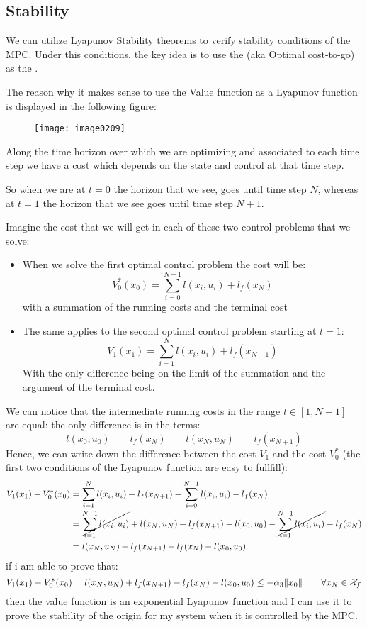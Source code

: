 \subsection{Stability}
We can utilize Lyapunov Stability theorems to verify stability conditions of the MPC. Under this conditions, the key idea is to use the  (aka Optimal cost-to-go) as the .

The reason why it makes sense to use the Value function as a Lyapunov function is displayed in the following figure:
\begin{figure}[!h]
\centering
\texttt{[image: image0209]}
\end{figure}
Along the time horizon over which we are optimizing and associated to each time step we have a cost which depends on the state and control at that time step.

So when we are at $t=0$ the horizon that we see, goes until time step $N$, whereas at $t=1$ the horizon that we see goes until time step $N+1$.

Imagine the cost that we will get in each of these two control problems that we solve:
\begin{itemize}
\item When we solve the first optimal control problem the cost will be:
\[V_0^*(x_0) = \sum_{i=0}^{N-1} l(x_i,u_i) + l_f(x_N)\]
with a summation of the running costs and the terminal cost
\item The same applies to the second optimal control problem starting at $t=1$:
\[V_1(x_1) = \sum_{i=1}^{N} l(x_i, u_i) + l_f(x_{N+1})\]
With the only difference being on the limit of the summation and the argument of the terminal cost.
\end{itemize}


We can notice that the intermediate running costs in the range $t\in[1,N-1]$ are equal: the only difference is in the terms:
\[l(x_0,u_0)\qquad l_f(x_N) \qquad l(x_N, u_N)\qquad l_f(x_{N+1})\]
Hence, we can write down the difference between the cost $V_1$ and the cost $V_0^*$ (the first two conditions of the Lyapunov function are easy to fullfill):
\begin{align*}
V_1(x_1) - V_0^*(x_0) &= \sum_{i=1}^{N}l(x_i,u_i) + l_f(x_{N+1}) - \sum_{i=0}^{N-1}l(x_i,u_i) - l_f(x_N)\\
&= \cancel{\sum_{i=1}^{N-1} l(x_i,u_i)} + l(x_N, u_N) + l_f(x_{N+1}) - l(x_0,u_0) - \cancel{\sum_{i=1}^{N-1} l(x_i,u_i)} - l_f(x_N)\\
&= l(x_N, u_N) + l_f(x_{N+1}) - l_f(x_N) - l(x_0, u_0)
\end{align*}
if i am able to prove that:
\[V_1(x_1) - V_0^*(x_0)  = l(x_N, u_N) + l_f(x_{N+1}) - l_f(x_N) - l(x_0, u_0) \le -\alpha_3 \lVert x_0\rVert\qquad \forall x_N\in\mathcal{X}_f\]
then the value function is an exponential Lyapunov function and I can use it to prove the stability of the origin for my system when it is controlled by the MPC.

